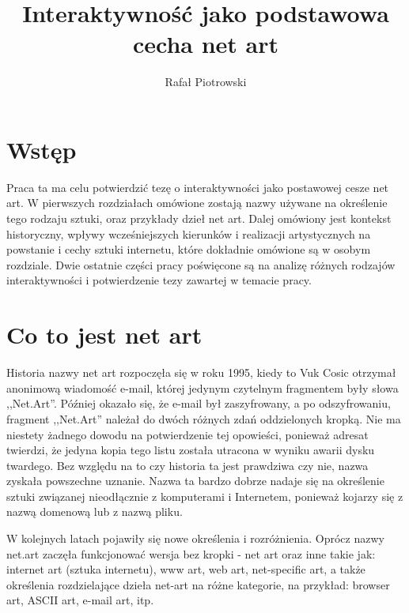 \documentclass[a4paper,12pt]{article}
\author{Rafał Piotrowski}
\title{Interaktywność jako podstawowa cecha net art}
\begin{document}
\maketitle


\section{Wstęp}
Praca ta ma celu potwierdzić tezę o interaktywności
jako postawowej cesze net art. W pierwszych rozdziałach omówione
zostają nazwy używane na określenie tego rodzaju sztuki,
oraz przykłady dzieł net art. Dalej omówiony jest kontekst historyczny,
wpływy wcześniejszych kierunków i realizacji artystycznych na powstanie
i cechy sztuki internetu, które dokładnie omówione są w osobym rozdziale.
Dwie ostatnie części pracy poświęcone są na analizę różnych rodzajów
interaktywności i potwierdzenie tezy zawartej w temacie pracy.

\section{Co to jest net art}
Historia nazwy net art rozpoczęła się w roku 1995, kiedy to Vuk Cosic
otrzymał anonimową wiadomość e-mail, której jedynym czytelnym fragmentem
były słowa ,,Net.Art''. Później okazało się, że e-mail był zaszyfrowany,
a po odszyfrowaniu, fragment ,,Net.Art'' należał do dwóch różnych zdań
oddzielonych kropką. Nie ma niestety żadnego dowodu na potwierdzenie
tej opowieści, ponieważ adresat twierdzi, że jedyna kopia tego listu
została utracona w wyniku awarii dysku twardego. Bez względu na to
czy historia ta jest prawdziwa czy nie, nazwa zyskała powszechne uznanie.
Nazwa ta bardzo dobrze nadaje się na określenie sztuki związanej
nieodłącznie z komputerami i Internetem, ponieważ kojarzy się
z nazwą domenową lub z nazwą pliku.

W kolejnych latach pojawiły się nowe określenia i rozróżnienia.
Oprócz nazwy net.art zaczęła funkcjonować wersja bez kropki - net art
oraz inne takie jak: internet art (sztuka internetu), www art, web art,
net-specific art, a także określenia rozdzielające dzieła net-art
na różne kategorie, na przykład: browser art, ASCII art, e-mail art, itp.
\end{document}
